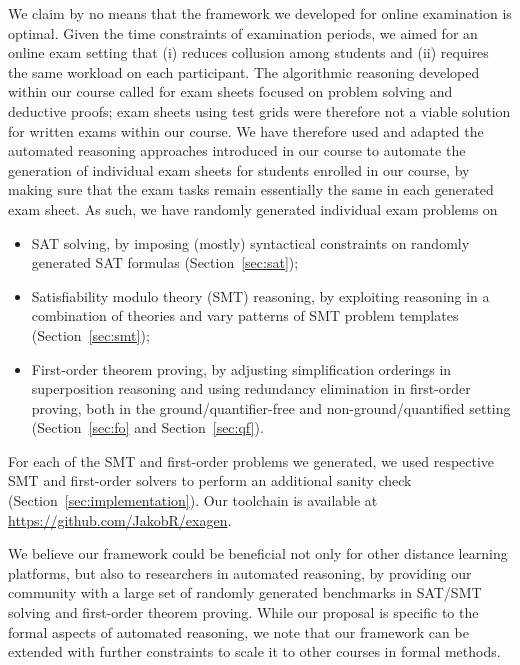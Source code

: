 We claim by no means that the framework we developed for online
examination is optimal.
Given the time constraints of examination periods, we aimed for an
online exam setting that (i) reduces collusion among students and  (ii)
requires the same workload on each participant.
The algorithmic reasoning developed within our
course called for exam sheets focused on problem solving and deductive
proofs;  exam sheets using test grids were therefore not a viable solution
for written exams within our course.
We have therefore used and adapted the automated reasoning approaches introduced in our
course to automate the generation of individual exam sheets for
students enrolled in our course, by making sure that the exam tasks
remain essentially the same in each generated exam sheet. As such, we have randomly generated
individual exam problems on 
\begin{itemize}
\item
    SAT solving, by imposing (mostly) syntactical constraints on
    randomly generated SAT formulas (Section~\ref{sec:sat});
\item Satisfiability modulo theory (SMT) reasoning, by exploiting reasoning in a combination of theories
  and vary patterns of SMT problem templates (Section~\ref{sec:smt}); 
\item First-order theorem proving, by adjusting simplification
  orderings in superposition reasoning and using redundancy elimination
  in first-order proving, both in the ground/quantifier-free 
  and non-ground/quantified setting (Section~\ref{sec:fo}
  and Section~\ref{sec:qf}). 
\end{itemize}
For each of the SMT and first-order problems we generated, we used respective
SMT and first-order solvers to perform an additional sanity check
(Section~\ref{sec:implementation}).
Our toolchain is available at \url{https://github.com/JakobR/exagen}.

We believe our framework could be beneficial not only for other
distance learning platforms, but also to researchers in automated
reasoning, by providing our community with a large set of randomly generated benchmarks in SAT/SMT solving and first-order theorem proving.
While our proposal is specific to the formal aspects of automated
reasoning, we note that  our framework can be extended with further
constraints to scale it to other courses in formal methods. 
